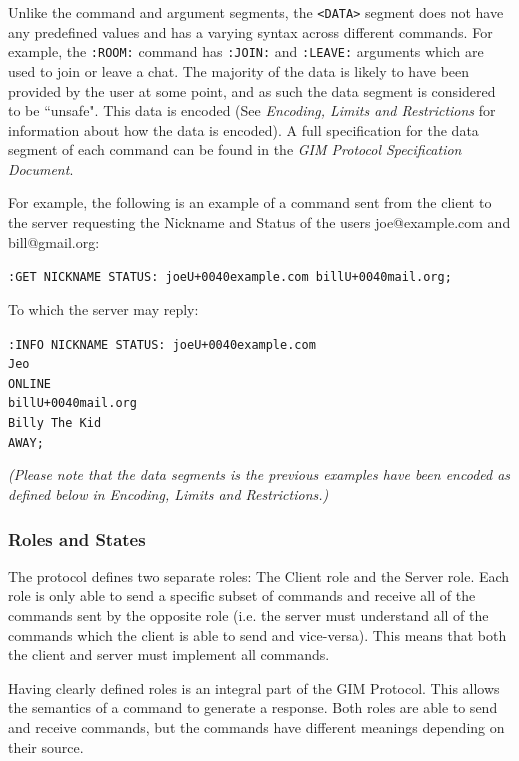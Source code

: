Unlike the command and argument segments, the \texttt{<DATA>} segment does not have any predefined values and has a varying syntax across different commands.  For example, the \texttt{:ROOM:} command has \texttt{:JOIN:} and \texttt{:LEAVE:} arguments which are used to join or leave a chat. The majority of the data is likely to have been provided by the user at some point, and as such the data segment is considered to be ``unsafe". This data is encoded (See \emph{Encoding, Limits and Restrictions} for information about how the data is encoded). A full specification for the data segment of each command can be found in the \emph{GIM Protocol Specification Document}. %

For example, the following is an example of a command sent from the client to the server requesting the Nickname and Status of the users joe@example.com and bill@gmail.org:

\texttt{:GET NICKNAME STATUS: joe\SLASH U+0040example.com bill\SLASH U+0040mail.org;}

To which the server may reply:

\texttt{:INFO NICKNAME STATUS: joe\SLASH U+0040example.com\\
Jeo\\
ONLINE\\
bill\SLASH U+0040mail.org\\
Billy The Kid\\
AWAY;}

\emph{(Please note that the data segments is the previous examples have been encoded as defined below in Encoding, Limits and Restrictions.)}

\subsubsection{Roles and States}

The protocol defines two separate roles: The Client role and the Server role. Each role is only able to send a specific subset of commands and receive all of the commands sent by the opposite role (i.e. the server must understand all of the commands which the client is able to send and vice-versa). This means that both the client and server must implement all commands.

Having clearly defined roles is an integral part of the GIM Protocol. This allows the semantics of a command to generate a response. Both roles are able to send and receive commands, but the commands have different meanings depending on their source. 

